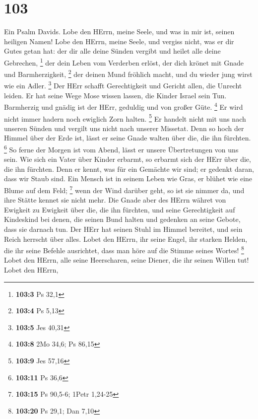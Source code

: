 \hypertarget{section-33}{%
\section{103}\label{section-33}}

 Ein Psalm Davids. Lobe den HErrn, meine Seele, und was in
mir ist, seinen heiligen Namen!  Lobe den HErrn, meine
Seele, und vergiss nicht, was er dir Gutes getan hat:  der
dir alle deine Sünden vergibt und heilet alle deine Gebrechen,
\footnote{\textbf{103:3} Ps 32,1}  der dein Leben vom
Verderben erlöst, der dich krönet mit Gnade und Barmherzigkeit,
\footnote{\textbf{103:4} Ps 5,13}  der deinen Mund fröhlich
macht, und du wieder jung wirst wie ein Adler. \footnote{\textbf{103:5}
  Jes 40,31}  Der HErr schafft Gerechtigkeit und Gericht
allen, die Unrecht leiden.  Er hat seine Wege Mose wissen
lassen, die Kinder Israel sein Tun.  Barmherzig und gnädig
ist der HErr, geduldig und von großer Güte. \footnote{\textbf{103:8} 2Mo
  34,6; Ps 86,15}  Er wird nicht immer hadern noch ewiglich
Zorn halten. \footnote{\textbf{103:9} Jes 57,16}  Er
handelt nicht mit uns nach unseren Sünden und vergilt uns nicht nach
unserer Missetat.  Denn so hoch der Himmel über der Erde
ist, lässt er seine Gnade walten über die, die ihn fürchten. \footnote{\textbf{103:11}
  Ps 36,6}  So ferne der Morgen ist vom Abend, lässt er
unsere Übertretungen von uns sein.  Wie sich ein Vater über
Kinder erbarmt, so erbarmt sich der HErr über die, die ihn fürchten.
 Denn er kennt, was für ein Gemächte wir sind; er gedenkt
daran, dass wir Staub sind.  Ein Mensch ist in seinem Leben
wie Gras, er blühet wie eine Blume auf dem Feld; \footnote{\textbf{103:15}
  Ps 90,5-6; 1Petr 1,24-25}  wenn der Wind darüber geht, so
ist sie nimmer da, und ihre Stätte kennet sie nicht mehr. 
Die Gnade aber des HErrn währet von Ewigkeit zu Ewigkeit über die, die
ihn fürchten, und seine Gerechtigkeit auf Kindeskind  bei
denen, die seinen Bund halten und gedenken an seine Gebote, dass sie
darnach tun.  Der HErr hat seinen Stuhl im Himmel bereitet,
und sein Reich herrscht über alles.  Lobet den HErrn, ihr
seine Engel, ihr starken Helden, die ihr seine Befehle ausrichtet, dass
man höre auf die Stimme seines Wortes! \footnote{\textbf{103:20} Ps
  29,1; Dan 7,10}  Lobet den HErrn, alle seine Heerscharen,
seine Diener, die ihr seinen Willen tut!  Lobet den HErrn,

